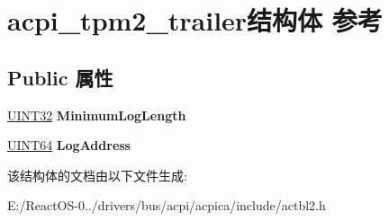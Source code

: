 \hypertarget{structacpi__tpm2__trailer}{}\section{acpi\+\_\+tpm2\+\_\+trailer结构体 参考}
\label{structacpi__tpm2__trailer}
\subsection*{Public 属性}
\begin{DoxyCompactItemize}
\item 
\mbox{\label{structacpi__tpm2__trailer_af1a24cdb85bf23e2c14e8645a27e898d}} 
\hyperlink{_processor_bind_8h_ae1e6edbbc26d6fbc71a90190d0266018}{U\+I\+N\+T32} {\bfseries Minimum\+Log\+Length}
\item 
\mbox{\label{structacpi__tpm2__trailer_ab67f6bfe83cb2d108db9b8a3c9e5d432}} 
\hyperlink{_processor_bind_8h_a57be03562867144161c1bfee95ca8f7c}{U\+I\+N\+T64} {\bfseries Log\+Address}
\end{DoxyCompactItemize}


该结构体的文档由以下文件生成\+:\begin{DoxyCompactItemize}
\item 
E\+:/\+React\+O\+S-\/0../drivers/bus/acpi/acpica/include/actbl2.\+h\end{DoxyCompactItemize}
